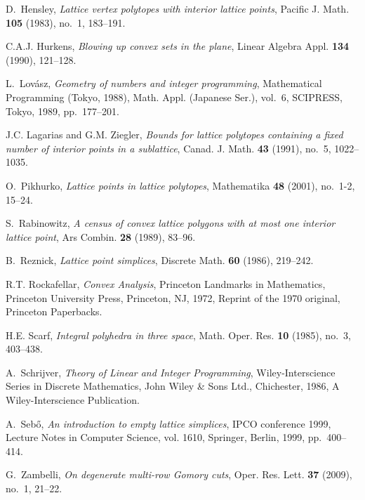 \documentclass[a4paper]{article}
\theoremstyle{plain}
\begin{document}
\begin{thebibliography}{ALWW07}
D.~Hensley, \emph{Lattice vertex polytopes with interior lattice points},
  Pacific J. Math. \textbf{105} (1983), no.~1, 183--191. 

C.A.J. Hurkens, \emph{Blowing up convex sets in the plane}, Linear Algebra
  Appl. \textbf{134} (1990), 121--128. 

L.~Lov{\'a}sz, \emph{Geometry of numbers and integer programming}, Mathematical
  {P}rogramming ({T}okyo, 1988), Math. Appl. (Japanese Ser.), vol.~6, SCIPRESS,
  Tokyo, 1989, pp.~177--201. 

J.C. Lagarias and G.M. Ziegler, \emph{Bounds for lattice polytopes containing a
  fixed number of interior points in a sublattice}, Canad. J. Math. \textbf{43}
  (1991), no.~5, 1022--1035. 

O.~Pikhurko, \emph{Lattice points in lattice polytopes}, Mathematika
  \textbf{48} (2001), no.~1-2, 15--24. 

S.~Rabinowitz, \emph{A census of convex lattice polygons with at most one
  interior lattice point}, Ars Combin. \textbf{28} (1989), 83--96.

B.~Reznick, \emph{Lattice point simplices}, Discrete Math. \textbf{60} (1986),
  219--242. 

R.T. Rockafellar, \emph{Convex {A}nalysis}, Princeton Landmarks in Mathematics,
  Princeton University Press, Princeton, NJ, 1972, Reprint of the 1970
  original, Princeton Paperbacks.

H.E. Scarf, \emph{Integral polyhedra in three space}, Math. Oper. Res.
  \textbf{10} (1985), no.~3, 403--438. 

A.~Schrijver, \emph{Theory of {L}inear and {I}nteger {P}rogramming},
  Wiley-Interscience Series in Discrete Mathematics, John Wiley \& Sons Ltd.,
  Chichester, 1986, A Wiley-Interscience Publication. 

A.~Seb{\H{o}}, \emph{An introduction to empty lattice simplices}, IPCO
  conference 1999, Lecture Notes in Computer Science, vol. 1610, Springer,
  Berlin, 1999, pp.~400--414. 

G.~Zambelli, \emph{On degenerate multi-row {G}omory cuts}, Oper. Res. Lett.
  \textbf{37} (2009), no.~1, 21--22. 

\end{thebibliography}
\end{document}
